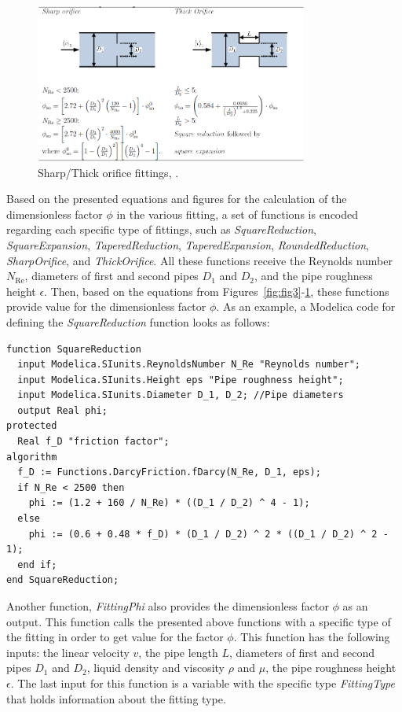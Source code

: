 \documentclass[%
]{USN-PhD}
\begin{document}
\begin{figure}[!ht]
  \centering
 \includegraphics[width=0.8\textwidth]{fig/Sharp_fit}
 \caption{Sharp/Thick orifice fittings, \cite{LieL:18}.}
  \label{fig:fig6}
\end{figure}

Based on the presented equations and figures for the calculation of the dimensionless factor $\phi$ in the various fitting, a set of functions is encoded regarding each specific type of fittings, such as \emph{SquareReduction}, \emph{SquareExpansion}, \emph{TaperedReduction}, \emph{TaperedExpansion}, \emph{RoundedReduction}, \emph{SharpOrifice}, and \emph{ThickOrifice}. All these functions receive the Reynolds number $N_\mathrm{Re}$, diameters of first and second pipes $D_1$ and $D_2$, and the pipe roughness height $\epsilon$. Then, based on the equations from Figures~\ref{fig:fig3}-\ref{fig:fig6}, these functions provide value for the dimensionless factor $\phi$. As an example, a Modelica code for defining the \emph{SquareReduction} function looks as follows:

\begin{lstlisting}[language = modelica]
function SquareReduction
  input Modelica.SIunits.ReynoldsNumber N_Re "Reynolds number";
  input Modelica.SIunits.Height eps "Pipe roughness height";
  input Modelica.SIunits.Diameter D_1, D_2; //Pipe diameters
  output Real phi;
protected
  Real f_D "friction factor";
algorithm
  f_D := Functions.DarcyFriction.fDarcy(N_Re, D_1, eps);
  if N_Re < 2500 then
    phi := (1.2 + 160 / N_Re) * ((D_1 / D_2) ^ 4 - 1);
  else
    phi := (0.6 + 0.48 * f_D) * (D_1 / D_2) ^ 2 * ((D_1 / D_2) ^ 2 - 1);
  end if;
end SquareReduction;
\end{lstlisting}

Another function, \emph{FittingPhi} also provides the dimensionless factor $\phi$ as an output. This function calls the presented above functions with a specific type of the fitting in order to get value for the factor $\phi$. This function has the following inputs: the linear velocity $v$, the pipe length $L$, diameters of first and second pipes $D_1$ and $D_2$, liquid density and viscosity $\rho$ and $\mu$, the pipe roughness height $\epsilon$. The last input for this function is a variable with the specific type \emph{FittingType} that holds information about the fitting type.
\end{document}
